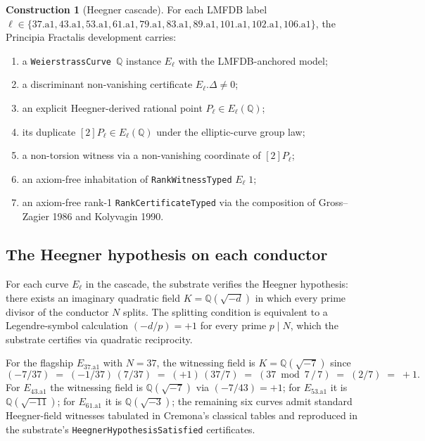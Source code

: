 \documentclass[11pt,a4paper]{article}
\theoremstyle{plain}
\theoremstyle{definition}
\newtheorem{construction}[theorem]{Construction}
\begin{document}
\begin{construction}[Heegner cascade]
\label{con:heegner}
For each LMFDB label $\ell \in \{37.\mathrm{a}1, 43.\mathrm{a}1,
53.\mathrm{a}1, 61.\mathrm{a}1, 79.\mathrm{a}1, 83.\mathrm{a}1,
89.\mathrm{a}1, 101.\mathrm{a}1, 102.\mathrm{a}1,
106.\mathrm{a}1\}$, the Principia Fractalis development carries:
\begin{enumerate}[leftmargin=*,nosep]
\item a \texttt{WeierstrassCurve}~$\mathbb{Q}$ instance
$E_{\ell}$ with the LMFDB-anchored model;
\item a discriminant non-vanishing certificate
$E_{\ell}.\Delta \ne 0$;
\item an explicit Heegner-derived rational point
$P_{\ell} \in E_{\ell}(\mathbb{Q})$;
\item its duplicate
$[2]P_{\ell} \in E_{\ell}(\mathbb{Q})$ under the elliptic-curve
group law;
\item a non-torsion witness via a non-vanishing coordinate of
$[2]P_{\ell}$;
\item an axiom-free inhabitation of \texttt{RankWitnessTyped}
$E_{\ell}\;1$;
\item an axiom-free rank-1 \texttt{RankCertificateTyped} via the
composition of Gross--Zagier 1986 and Kolyvagin 1990.
\end{enumerate}
\end{construction}

\subsection*{The Heegner hypothesis on each conductor}

For each curve $E_{\ell}$ in the cascade, the substrate verifies the
Heegner hypothesis: there exists an imaginary quadratic field
$K = \mathbb{Q}(\sqrt{-d})$ in which every prime divisor of the
conductor $N$ splits. The splitting condition is equivalent to a
Legendre-symbol calculation $(-d/p) = +1$ for every prime $p \mid N$,
which the substrate certifies via quadratic reciprocity.

For the flagship $E_{37.\mathrm{a}1}$ with $N = 37$, the witnessing
field is $K = \mathbb{Q}(\sqrt{-7})$ since
\[
(-7/37) \;=\; (-1/37)\,(7/37)
\;=\; (+1)\,(37/7)
\;=\; (37 \bmod 7 \,/\, 7)
\;=\; (2/7) \;=\; +1.
\]
For $E_{43.\mathrm{a}1}$ the witnessing field is
$\mathbb{Q}(\sqrt{-7})$ via $(-7/43) = +1$; for
$E_{53.\mathrm{a}1}$ it is $\mathbb{Q}(\sqrt{-11})$; for
$E_{61.\mathrm{a}1}$ it is $\mathbb{Q}(\sqrt{-3})$; the remaining
six curves admit standard Heegner-field witnesses tabulated in
Cremona's classical tables and reproduced in the substrate's
\texttt{HeegnerHypothesisSatisfied} certificates.
\end{document}
